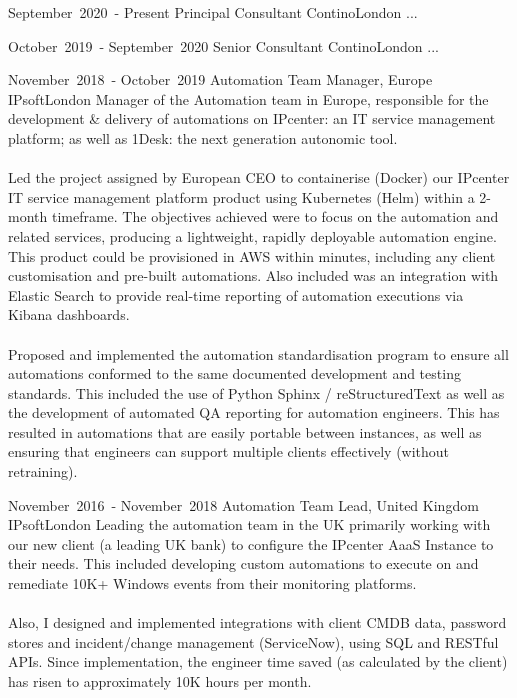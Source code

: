 
\edef\hc{\string:}

\cventry %
  {\mbox{September 2020 -} \mbox{Present}}
  {Principal Consultant}
  {Contino}{London}{}
  { 
    ...
  }

\cventry %
  {\mbox{October 2019 -} \mbox{September 2020}}
  {Senior Consultant}
  {Contino}{London}{}
  {
    ...  
  }

\cventry %
  {\mbox{November 2018 -} \mbox{October 2019}}
  {Automation Team Manager, Europe}
  {IPsoft}{London}{}
  { 
    Manager of the Automation team in Europe, responsible for the 
    development \& delivery of automations on IPcenter: an IT service management 
    platform; as well as 1Desk: the next generation autonomic tool.\\~\\
    Led the project assigned by European CEO to containerise (Docker) our IPcenter 
    IT service management platform product using Kubernetes (Helm) within a 2-month timeframe. 
    The objectives achieved were to focus on the automation and related services, 
    producing a lightweight, rapidly deployable automation engine. 
    This product could be provisioned in AWS within minutes, including any client 
    customisation and pre-built automations. 
    Also included was an integration with Elastic Search to provide real-time 
    reporting of automation executions via Kibana dashboards.\\~\\
    Proposed and implemented the automation standardisation program to ensure all 
    automations conformed to the same documented development and testing standards. 
    This included the use of Python Sphinx / reStructuredText as well as the development 
    of automated QA reporting for automation engineers. 
    This has resulted in automations that are easily portable between instances, 
    as well as ensuring that engineers can support multiple clients effectively (without retraining).\\ 
  }

\cventry %
  {\mbox{November 2016 -} \mbox{November 2018}}
  {Automation Team Lead, United Kingdom}
  {IPsoft}{London}{}
  {
    Leading the automation team in the UK primarily working with our new client (a leading UK bank) to 
    configure the IPcenter AaaS Instance to their needs. This included developing custom 
    automations to execute on and remediate 10K+ Windows events from their monitoring platforms.\\~\\ 
    Also, I designed and implemented integrations with client CMDB data, password stores 
    and incident/change management (ServiceNow), using SQL and RESTful APIs. Since 
    implementation, the engineer time saved (as calculated by the client) has risen to approximately 
    10K hours per month.\\
  }

